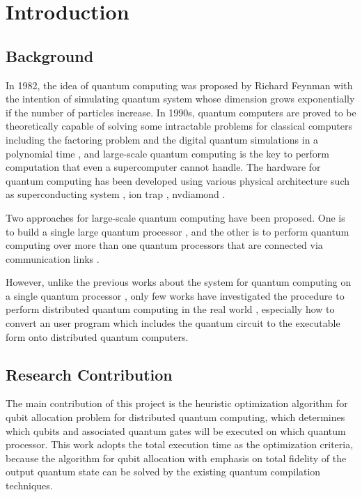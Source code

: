 \chapter{Introduction}
\label{introduction}

\section{Background}
\label{introduction:background}
 In 1982, the idea of quantum computing was proposed by Richard Feynman \cite{Feynman} with the intention of simulating quantum system whose dimension grows exponentially if the number of particles increase.  In 1990s, quantum computers are proved to be theoretically capable of solving some intractable problems for classical computers including the factoring problem \cite{Shor} and the digital quantum simulations in a polynomial time \cite{Lloyd}, and large-scale quantum computing is the key to perform computation that even a supercomputer cannot handle.  The hardware for quantum computing has been developed using various physical architecture such as superconducting system \cite{superconducting}, ion trap \cite{iontrap}, nvdiamond \cite{nvdiamond}.
 
  Two approaches for large-scale quantum computing have been proposed. One is to build a single large quantum processor \cite{rsa}, and the other is to perform quantum computing over more than one quantum processors that are connected via communication links \cite{grover}.  
 
 However, unlike the previous works about the system for quantum computing on a single quantum processor \cite{qubitallocation, noisy},  only few works have investigated the procedure to perform distributed quantum computing in the real world \cite{qmpi}, especially how to convert an user program which includes the quantum circuit to the executable form onto distributed quantum computers.

\section{Research Contribution}
\label{introduction:research_contribution}
The main contribution of this project is the heuristic optimization algorithm for qubit allocation problem for distributed quantum computing, which determines which qubits and associated quantum gates will be executed on which quantum processor.  This work adopts the total execution time as the optimization criteria, because the algorithm for qubit allocation with emphasis on total fidelity of the output quantum state can be solved by the existing quantum compilation techniques.

